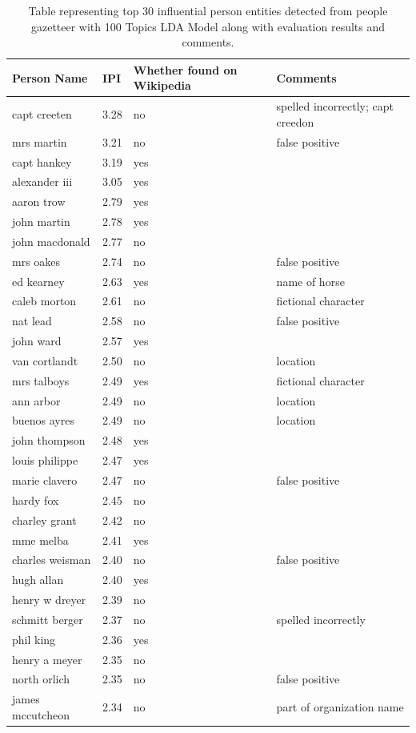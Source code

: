\documentclass[10pt,journal,compsoc]{IEEEtran}
\begin{document}
\begin{table}
\caption{Table representing top 30 influential person entities detected from people gazetteer with 100 Topics LDA Model along with evaluation results and comments.}
\label{table:app2}
\centering
\begin{tabular}{|l|l|p{3cm}|p{3cm}|}
\hline
\textbf{Person Name}      & \textbf{IPI}      & \textbf{Whether found on Wikipedia} & \textbf{Comments}                                     \\ \hline
capt creeten & 3.28 & no & spelled incorrectly; capt creedon \\ \hline
mrs martin & 3.21 & no & false positive \\ \hline
capt hankey & 3.19 & yes &  \\ \hline
alexander iii & 3.05 & yes &  \\ \hline
aaron trow & 2.79 & yes &  \\ \hline
john martin & 2.78 & yes &  \\ \hline
john macdonald & 2.77 & no &  \\ \hline
mrs oakes & 2.74 & no & false positive \\ \hline
ed kearney & 2.63 & yes & name of horse \\ \hline
caleb morton & 2.61 & no & fictional character \\ \hline
nat lead & 2.58 & no & false positive \\ \hline
john ward & 2.57 & yes &  \\ \hline
van cortlandt & 2.50 & no & location \\ \hline
mrs talboys & 2.49 & yes & fictional character \\ \hline
ann arbor & 2.49 & no & location \\ \hline
buenos ayres & 2.49 & no & location \\ \hline
john thompson & 2.48 & yes &  \\ \hline
louis philippe & 2.47 & yes &  \\ \hline
marie clavero & 2.47 & no & false positive \\ \hline
hardy fox & 2.45 & no &  \\ \hline
charley grant & 2.42 & no & \\ \hline
mme melba & 2.41 & yes &  \\ \hline
charles weisman & 2.40 & no & false positive \\ \hline
hugh allan & 2.40 & yes &  \\ \hline
henry w dreyer & 2.39 & no &  \\ \hline
schmitt berger & 2.37 & no & spelled incorrectly \\ \hline
phil king & 2.36 & yes &  \\ \hline
henry a meyer & 2.35 & no &  \\ \hline
north orlich & 2.35 & no & false positive \\ \hline
james mccutcheon & 2.34 & no & part of organization name \\ \hline
\end{tabular}

\end{table}
\end{document}

